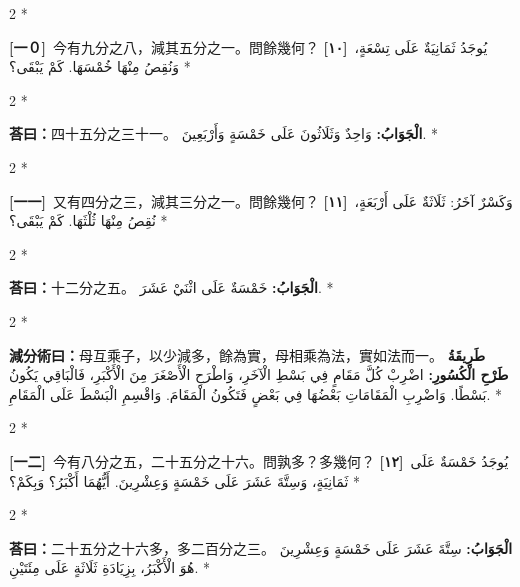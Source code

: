 \documentclass[11pt,a4paper]{article}
\newcommand{\ar}[1]{\arabicfont\beginR #1\endR}
\newcommand{\problemnum}[1]{\textbf{[\ignorespaces#1\unskip]}}
\newenvironment{bilingual}{%
  \begin{paracol}{2}%
  \switchcolumn[0]*%
}{%
  \end{paracol}%
}
\newcommand{\cnline}[1]{\switchcolumn[0]\noindent #1 \switchcolumn[1]}
\newcommand{\arline}[1]{\noindent\ar{#1} \switchcolumn[0]*}
\newenvironment{prob bilingual}{%
  \begin{paracol}{2}%
  \switchcolumn[0]*%
}{%
  \end{paracol}%
  \vspace{0.3em}%
}
\begin{document}
\begin{bilingual}
\cnline{\problemnum{一０}\, 今有九分之八，減其五分之一。問餘幾何？}
\arline{\problemnum{١٠}\, يُوجَدُ ثَمَانِيَةٌ عَلَى تِسْعَةٍ، وَنُقِصُ مِنْهَا خُمْسَهَا. كَمْ يَبْقَى؟}
\end{bilingual}

\begin{bilingual}
\cnline{\textcolor{answercolor}{\textbf{荅曰：}}四十五分之三十一。}
\arline{\textcolor{answercolor}{\textbf{الْجَوَابُ:}} وَاحِدٌ وَثَلَاثُونَ عَلَى خَمْسَةٍ وَأَرْبَعِينَ.}
\end{bilingual}

\begin{bilingual}
\cnline{\problemnum{一一}\, 又有四分之三，減其三分之一。問餘幾何？}
\arline{\problemnum{١١}\, وَكَسْرٌ آخَرُ: ثَلَاثَةٌ عَلَى أَرْبَعَةٍ، نُقِصُ مِنْهَا ثُلْثَهَا. كَمْ يَبْقَى؟}
\end{bilingual}

\begin{bilingual}
\cnline{\textcolor{answercolor}{\textbf{荅曰：}}十二分之五。}
\arline{\textcolor{answercolor}{\textbf{الْجَوَابُ:}} خَمْسَةٌ عَلَى اثْنَيْ عَشَرَ.}
\end{bilingual}

\begin{bilingual}
\cnline{%
\textcolor{methodcolor}{\textbf{減分術曰：}}母互乘子，以少減多，餘為實，母相乘為法，實如法而一。
}
\arline{%
\textcolor{methodcolor}{\textbf{طَرِيقَةُ طَرْحِ الْكُسُورِ:}} اضْرِبْ كُلَّ مَقَامٍ فِي بَسْطِ الْآخَرِ، وَاطْرَحِ الْأَصْغَرَ مِنَ الْأَكْبَرِ، فَالْبَاقِي يَكُونُ بَسْطًا. وَاضْرِبِ الْمَقَامَاتِ بَعْضُهَا فِي بَعْضٍ فَتَكُونُ الْمَقَامَ. وَاقْسِمِ الْبَسْطَ عَلَى الْمَقَامِ.
}
\end{bilingual}


\begin{bilingual}
\cnline{\problemnum{一二}\, 今有八分之五，二十五分之十六。問孰多？多幾何？}
\arline{\problemnum{١٢}\, يُوجَدُ خَمْسَةٌ عَلَى ثَمَانِيَةٍ، وَسِتَّةَ عَشَرَ عَلَى خَمْسَةٍ وَعِشْرِينَ. أَيُّهُمَا أَكْبَرُ؟ وَبِكَمْ؟}
\end{bilingual}

\begin{bilingual}
\cnline{\textcolor{answercolor}{\textbf{荅曰：}}二十五分之十六多，多二百分之三。}
\arline{\textcolor{answercolor}{\textbf{الْجَوَابُ:}} سِتَّةَ عَشَرَ عَلَى خَمْسَةٍ وَعِشْرِينَ هُوَ الْأَكْبَرُ، بِزِيَادَةِ ثَلَاثَةٍ عَلَى مِئَتَيْنِ.}
\end{bilingual}
\end{document}

